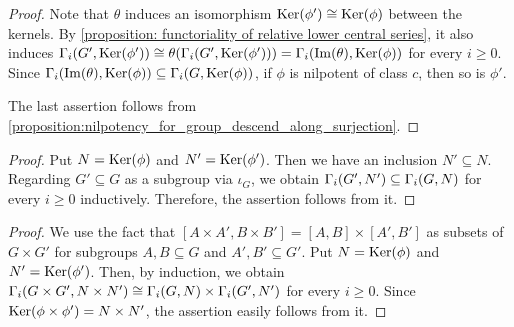 \begin{proof}
Note that $\theta$ induces an isomorphism $\operatorname{Ker}(\phi')\cong \operatorname{Ker}(\phi)$ between the kernels.
By \cref{proposition: functoriality of relative lower central series}, it also induces $\Gamma_i(G',\operatorname{Ker}(\phi'))\cong \theta(\Gamma_i(G',\operatorname{Ker}(\phi'))) = \Gamma_i(\operatorname{Im}(\theta),\operatorname{Ker}(\phi))$ for every $i\geq 0$.
Since $\Gamma_i(\operatorname{Im}(\theta),\operatorname{Ker}(\phi)) \subseteq \Gamma_i(G,\operatorname{Ker}(\phi))$, if $\phi$ is nilpotent of class $c$, then so is $\phi'$.

The last assertion follows from \cref{proposition:nilpotency_for_group_descend_along_surjection}.
\end{proof}



\begin{proof}
Put $N=\operatorname{Ker}(\phi)$ and $N'=\operatorname{Ker}(\phi')$. Then we have an inclusion $N' \subseteq N$. Regarding $G'\subseteq G$ as a subgroup via $\iota_G$, we obtain $\Gamma_{i}(G',N') \subseteq \Gamma_{i}(G,N)$ for every $i \geq 0$ inductively. Therefore, the assertion follows from it.
\end{proof}



\begin{proof}
We use the fact that $[A\times A',B\times B'] = [A,B]\times [A',B']$ as subsets of $G\times G'$ for subgroups $A,B\subseteq G$ and $A',B'\subseteq G'$.
Put $N=\operatorname{Ker}(\phi)$ and $N'=\operatorname{Ker}(\phi')$.
Then, by induction, we obtain $\Gamma_i(G\times G',N\times N') \cong \Gamma_i(G,N)\times \Gamma_i(G',N')$ for every $i\geq 0$.
Since $\operatorname{Ker}(\phi\times\phi')=N\times N'$, the assertion easily follows from it.
\end{proof}





